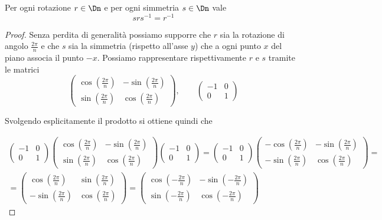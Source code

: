 \documentclass[11pt]{scrartcl}
\begin{document}
	\begin{lemma}
		Per ogni rotazione $r \in \Dn$ e per ogni simmetria $s \in \Dn$ vale
		\[srs^{-1} = r^{-1}\]
	\end{lemma}
	
	\begin{proof}
		Senza perdita di generalità possiamo supporre che $r$ sia la rotazione 
		di angolo $\frac{2\pi}{n}$ e che $s$ sia la simmetria
		(rispetto all'asse $y$) che 
		a ogni punto $x$ del piano associa il punto $-x$. Possiamo rappresentare
		rispettivamente $r$ e $s$ tramite le matrici
		\begingroup
		\renewcommand{\arraystretch}{1.2}
		\[
		\begin{pmatrix}
			\cos\left(\frac{2\pi}{n}\right) & -\sin\left(\frac{2\pi}{n}\right)\\
			\sin\left(\frac{2\pi}{n}\right) & \cos\left(\frac{2\pi}{n}\right)
		\end{pmatrix}, \qquad
		\begin{pmatrix}
			-1 & 0\\
			0 & 1
		\end{pmatrix}
		\]
		\endgroup
		
		Svolgendo esplicitamente il prodotto si ottiene quindi che
		
		\begingroup
		\renewcommand{\arraystretch}{1.2}
		\begin{multline*}
			\begin{pmatrix}
				-1 & 0\\
				0 & 1
			\end{pmatrix}
			\begin{pmatrix}
				\cos\left(\frac{2\pi}{n}\right) & -\sin\left(\frac{2\pi}{n}\right)\\
				\sin\left(\frac{2\pi}{n}\right) & \cos\left(\frac{2\pi}{n}\right)
			\end{pmatrix}
			\begin{pmatrix}
				-1 & 0\\
				0 & 1
			\end{pmatrix} = 
			\begin{pmatrix}
				-1 & 0\\
				0 & 1
			\end{pmatrix}
			\begin{pmatrix}
				-\cos\left(\frac{2\pi}{n}\right) & -\sin\left(\frac{2\pi}{n}\right)\\
				-\sin\left(\frac{2\pi}{n}\right) & \cos\left(\frac{2\pi}{n}\right)
			\end{pmatrix} = \\ =
			\begin{pmatrix}
				\cos\left(\frac{2\pi}{n}\right) & \sin\left(\frac{2\pi}{n}\right)\\
				-\sin\left(\frac{2\pi}{n}\right) & \cos\left(\frac{2\pi}{n}\right)
			\end{pmatrix} = 
			\begin{pmatrix}
				\cos\left(-\frac{2\pi}{n}\right) & -\sin\left(-\frac{2\pi}{n}\right)\\
				\sin\left(-\frac{2\pi}{n}\right) & \cos\left(-\frac{2\pi}{n}\right)
			\end{pmatrix}
		\end{multline*}
		\endgroup
		

\end{proof}
\end{document}
